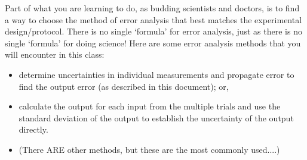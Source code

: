 Part of what you are learning to do, as budding scientists and doctors, is to find a way to choose the method of error analysis that best matches the experimental design/protocol. 
There is no single `formula' for error analysis, just as there is no single `formula' for doing science! 
Here are some error analysis methods that you will encounter in this class:
\begin{itemize}
\itemsep-0.3em
\item determine uncertainties in individual measurements and propagate error to find the output error (as described in this document); or,
\item calculate the output for each input from the multiple trials and use the standard deviation of the output to establish the uncertainty of the output directly.
\item (There ARE other methods, but these are the most commonly used....)
\end{itemize}